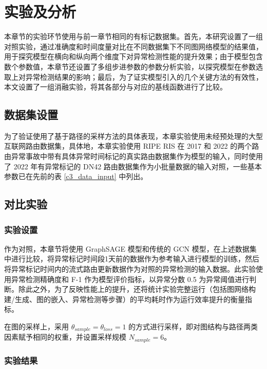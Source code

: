 \section{实验及分析}

本章节的实验环节使用与前一章节相同的有标记数据集。首先，本研究设置了一组对照实验，通过准确度和时间度量对比在不同数据集下不同图网络模型的结果值，用于探究模型在横向和纵向两个维度下对异常检测性能的提升效果；由于模型包含数个参数值，本章节还设置了多组步进参数的参数分析实验，以探究模型在参数选取上对异常检测结果的影响；最后，为了证实模型引入的几个关键方法的有效性，本文设置了一组消融实验，将其各部分与对应的基线函数进行了比较。

\subsection{数据集设置}

为了验证使用了基于路径的采样方法的具体表现，本章实验使用未经预处理的大型互联网路由数据集，具体地，本章实验使用 RIPE RIS 在 2017 和 2022 的两个路由异常事故中带有具体异常时间标记的真实路由数据集作为模型的输入，同时使用了 2022 年有异常标记的 DN42 路由数据集作为小批量数据的输入对照，一些基本参数已在先前的表 \ref{c3_data_input} 中列出。

\subsection{对比实验}

\subsubsection{实验设置}

作为对照，本章节将使用 GraphSAGE 模型和传统的 GCN 模型，在上述数据集中进行比较，将异常标记时间段1天前的数据作为参考输入进行模型的训练，然后将异常标记时间内的流式路由更新数据作为对照的异常检测的输入数据。此实验使用异常检测精确度和 F-1 作为模型评价指标，以异常分数 0.5 为异常阈值进行判断。除此之外，为了反映性能上的提升，还将统计实验完整运行（包括图网络构建/生成、图的嵌入、异常检测等步骤）的平均耗时作为运行效率提升的衡量指标。

在图的采样上，采用 $\theta_{sample} = \theta_{loss} = 1$ 的方式进行采样，即对图结构与路径两类因素赋予相同的权重，并设置采样规模 $N_{sample} = 6$。

\subsubsection{实验结果}

